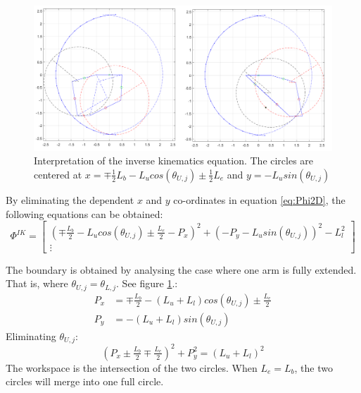 \begin{figure}[h!]
	\centering
	\includegraphics[width=\textwidth]{figures/Boundaries_2D.png}                                                     
	\caption[Interpretation of the inverse kinematics equation]{Interpretation of the inverse kinematics equation. The circles are centered at $x=\mp\tfrac{1}{2}L_b-L_u cos(\theta_{U,j})\pm\tfrac{1}{2}L_e$  and $y=-L_u sin(\theta_{U,j})$}
	\label{fig:inverse2D}
\end{figure}

By eliminating the dependent $x$ and $y$ co-ordinates in equation \ref{eq:Phi2D}, the following equations can be obtained:
\begin{equation}
    \Phi^{IK}=
    \begin{bmatrix}
     (\mp \frac{L_b}{2}-L_u cos(\theta_{U,j})\pm\frac{L_e}{2}-P_x)^2+(-P_y-L_u sin(\theta_{U,j}))^2-L_l^2 \\
         \vdots
    \end{bmatrix}
\end{equation}


The boundary is obtained by analysing the case where one arm is fully extended. That is, where $\theta_{U,j}=\theta_{L,j}$. See figure \ref{fig:inverse2D}.:
\begin{align*}
P_x&=\mp\tfrac{L_b}{2}-(L_u+L_l)cos(\theta_{U,j})\pm\tfrac{L_e}{2} \\
P_y&=-(L_u+L_l)sin(\theta_{U,j})
\end{align*}
Eliminating $\theta_{U,j}$:
\begin{equation}
(P_x\pm\tfrac{L_b}{2}\mp\tfrac{L_e}{2})^2+P_y^2=(L_u+L_l)^2
\end{equation}
The workspace is the intersection of the two circles. When $L_e=L_b$, the two circles will merge into one full circle.


